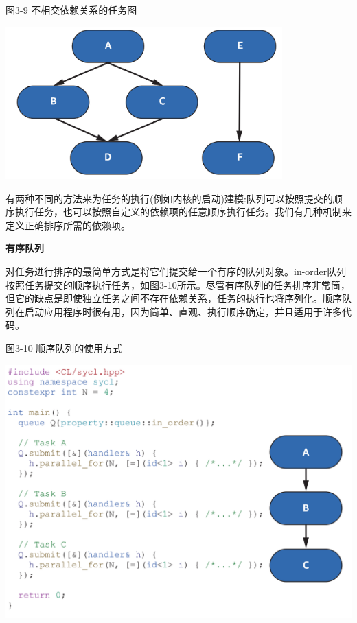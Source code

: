 \hspace*{\fill} \par %
图3-9 不相交依赖关系的任务图
\begin{center}
	\includegraphics[width=0.8\textwidth]{content/chapter-3/images/5}
\end{center}

有两种不同的方法来为任务的执行(例如内核的启动)建模:队列可以按照提交的顺序执行任务，也可以按照自定义的依赖项的任意顺序执行任务。我们有几种机制来定义正确排序所需的依赖项。\par

\hspace*{\fill} \par %
\textbf{有序队列}

对任务进行排序的最简单方式是将它们提交给一个有序的队列对象。in-order队列按照任务提交的顺序执行任务，如图3-10所示。尽管有序队列的任务排序非常简，但它的缺点是即使独立任务之间不存在依赖关系，任务的执行也将序列化。顺序队列在启动应用程序时很有用，因为简单、直观、执行顺序确定，并且适用于许多代码。\par

\hspace*{\fill} \par %
图3-10 顺序队列的使用方式
\begin{center}
	\includegraphics[width=1.0\textwidth]{content/chapter-3/images/6}
\end{center}


